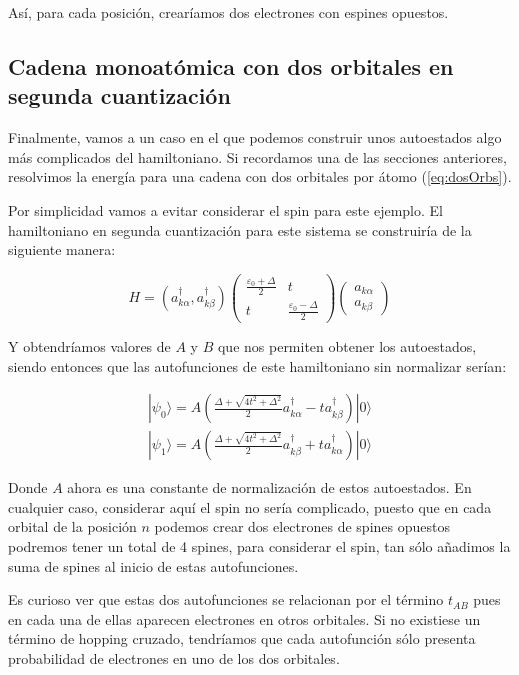 \documentclass{article} %
\begin{document}
Así, para cada posición, crearíamos dos electrones con espines opuestos.

\subsection{Cadena monoatómica con dos orbitales en segunda cuantización}

Finalmente, vamos a un caso en el que podemos construir unos autoestados algo más complicados del hamiltoniano. Si recordamos una de las secciones anteriores, resolvimos la energía para una cadena con dos orbitales por átomo (\ref{eq:dosOrbs}).

Por simplicidad vamos a evitar considerar el spin para este ejemplo. El hamiltoniano en segunda cuantización para este sistema se construiría de la siguiente manera:

$$
H = \left(a^{\dagger}_{k \alpha}, a^{\dagger}_{k \beta}\right)\left(\begin{array}{cc}
\frac{\varepsilon_0 + \Delta}{2} & t \\
t & \frac{\varepsilon_0 - \Delta}{2}
\end{array}\right)\left(\begin{array}{c}
a_{k \alpha} \\
a_{k \beta}
\end{array}\right)
$$

Y obtendríamos valores de $A$ y $B$ que nos permiten obtener los autoestados, siendo entonces que las autofunciones de este hamiltoniano sin normalizar serían:

$$
\begin{array}{c}
|\psi_0\rangle = A\left(\frac{\Delta + \sqrt{4t^2 + \Delta^2}}{2} a^{\dagger}_{k\alpha} - ta^{\dagger}_{k\beta}\right)|0\rangle \\
|\psi_1\rangle = A\left(\frac{\Delta + \sqrt{4t^2 + \Delta^2}}{2} a^{\dagger}_{k\beta} + ta^{\dagger}_{k\alpha}\right)|0\rangle
\end{array}
$$

Donde $A$ ahora es una constante de normalización de estos autoestados. En cualquier caso, considerar aquí el spin no sería complicado, puesto que en cada orbital de la posición $n$ podemos crear dos electrones de spines opuestos podremos tener un total de 4 spines, para considerar el spin, tan sólo añadimos la suma de spines al inicio de estas autofunciones.

Es curioso ver que estas dos autofunciones se relacionan por el término $t_{AB}$ pues en cada una de ellas aparecen electrones en otros orbitales. Si no existiese un término de hopping cruzado, tendríamos que cada autofunción sólo presenta probabilidad de electrones en uno de los dos orbitales.
\end{document}
